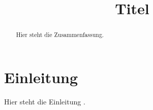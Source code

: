 \documentclass[10pt,letterpaper,final,conference]{IEEEtran}
\begin{document}
\pagestyle{empty}

\title{Titel}

\author{
\vspace*{1em}
}


\renewcommand{\baselinestretch}{1}
\maketitle
\pagestyle{empty}
 \begin{abstract}
 \pagestyle{empty}
 \thispagestyle{empty}
Hier steht die Zusammenfassung.
\end{abstract}

\section{Einleitung}
Hier steht die Einleitung \cite{Cal2003}.



\end{document}
